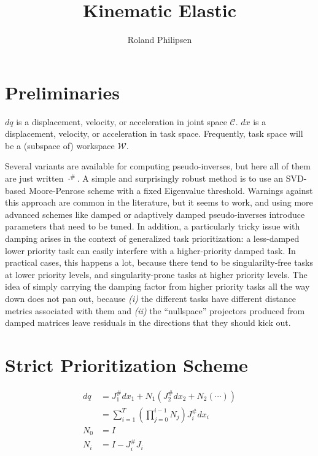 \documentclass{article}
\begin{document}
\title{Kinematic Elastic}
\author{Roland Philipsen}
\maketitle



\section{Preliminaries}

$dq$ is a displacement, velocity, or acceleration in joint space $\mathcal{C}$.
$dx$ is a displacement, velocity, or acceleration in task space.
Frequently, task space will be a (subspace of) workspace $\mathcal{W}$.

Several variants are available for computing pseudo-inverses, but here all of them are just written $\cdot^\#$.
A simple and surprisingly robust method is to use an SVD-based Moore-Penrose scheme with a fixed Eigenvalue threshold.
Warnings against this approach are common in the literature, but it seems to work, and using more advanced schemes like damped or adaptively damped pseudo-inverses introduce parameters that need to be tuned.
In addition, a particularly tricky issue with damping arises in the context of generalized task prioritization:
a less-damped lower priority task can easily interfere with a higher-priority damped task.
In practical cases, this happens a lot, because there tend to be singularilty-free tasks at lower priority levels, and singularity-prone tasks at higher priority levels.
The idea of simply carrying the damping factor from higher priority tasks all the way down does not pan out, because \emph{(i)} the different tasks have different distance metrics associated with them and \emph{(ii)} the ``nullspace'' projectors produced from damped matrices leave residuals in the directions that they should kick out.



\section{Strict Prioritization Scheme}

\begin{align}
  dq &= J_1^\#dx_1 + N_1 ( J_2^\#dx_2 + N_2 ( \cdots )) \\
  &= \sum_{i=1}^T \left( \prod_{j=0}^{i-1}N_j \right) J_i^\#dx_i\\
  N_0 &= I \\
  N_i &= I - J_i^\#J_i
\end{align}
\end{document}
